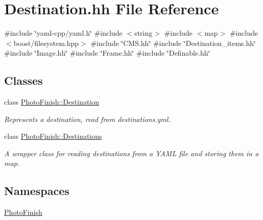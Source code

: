 \hypertarget{_destination_8hh}{}\section{Destination.\+hh File Reference}
\label{_destination_8hh}
{\ttfamily \#include \char`\"{}yaml-\/cpp/yaml.\+h\char`\"{}}\newline
{\ttfamily \#include $<$string$>$}\newline
{\ttfamily \#include $<$map$>$}\newline
{\ttfamily \#include $<$boost/filesystem.\+hpp$>$}\newline
{\ttfamily \#include \char`\"{}C\+M\+S.\+hh\char`\"{}}\newline
{\ttfamily \#include \char`\"{}Destination\+\_\+items.\+hh\char`\"{}}\newline
{\ttfamily \#include \char`\"{}Image.\+hh\char`\"{}}\newline
{\ttfamily \#include \char`\"{}Frame.\+hh\char`\"{}}\newline
{\ttfamily \#include \char`\"{}Definable.\+hh\char`\"{}}\newline
\subsection*{Classes}
\begin{DoxyCompactItemize}
\item 
class \hyperlink{class_photo_finish_1_1_destination}{Photo\+Finish\+::\+Destination}
\begin{DoxyCompactList}\small\item\em Represents a destination, read from destinations.\+yml. \end{DoxyCompactList}\item 
class \hyperlink{class_photo_finish_1_1_destinations}{Photo\+Finish\+::\+Destinations}
\begin{DoxyCompactList}\small\item\em A wrapper class for reading destinations from a Y\+A\+ML file and storing them in a map. \end{DoxyCompactList}\end{DoxyCompactItemize}
\subsection*{Namespaces}
\begin{DoxyCompactItemize}
\item 
 \hyperlink{namespace_photo_finish}{Photo\+Finish}
\end{DoxyCompactItemize}
